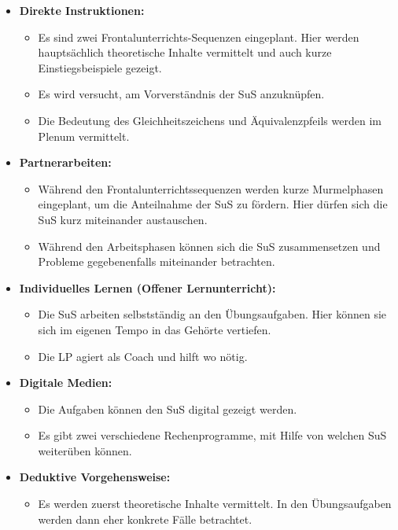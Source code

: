 \documentclass[
  10pt,
  a4paper,
  DIV=11]{scrartcl}
\providecommand{\tightlist}{%
  \setlength{\itemsep}{0pt}\setlength{\parskip}{0pt}}\usepackage{longtable,booktabs,array}
\begin{document}
\begin{itemize}
\tightlist
\item
  \textbf{Direkte Instruktionen:}

  \begin{itemize}
  \tightlist
  \item
    Es sind zwei Frontalunterrichts-Sequenzen eingeplant. Hier werden
    hauptsächlich theoretische Inhalte vermittelt und auch kurze
    Einstiegsbeispiele gezeigt.
  \item
    Es wird versucht, am Vorverständnis der SuS anzuknüpfen.
  \item
    Die Bedeutung des Gleichheitszeichens und Äquivalenzpfeils werden im
    Plenum vermittelt.
  \end{itemize}
\item
  \textbf{Partnerarbeiten:}

  \begin{itemize}
  \tightlist
  \item
    Während den Frontalunterrichtssequenzen werden kurze Murmelphasen
    eingeplant, um die Anteilnahme der SuS zu fördern. Hier dürfen sich
    die SuS kurz miteinander austauschen.
  \item
    Während den Arbeitsphasen können sich die SuS zusammensetzen und
    Probleme gegebenenfalls miteinander betrachten.
  \end{itemize}
\item
  \textbf{Individuelles Lernen (Offener Lernunterricht):}

  \begin{itemize}
  \tightlist
  \item
    Die SuS arbeiten selbstständig an den Übungsaufgaben. Hier können
    sie sich im eigenen Tempo in das Gehörte vertiefen.
  \item
    Die LP agiert als Coach und hilft wo nötig.
  \end{itemize}
\item
  \textbf{Digitale Medien:}

  \begin{itemize}
  \tightlist
  \item
    Die Aufgaben können den SuS digital gezeigt werden.
  \item
    Es gibt zwei verschiedene Rechenprogramme, mit Hilfe von welchen SuS
    weiterüben können.
  \end{itemize}
\item
  \textbf{Deduktive Vorgehensweise:}

  \begin{itemize}
  \tightlist
  \item
    Es werden zuerst theoretische Inhalte vermittelt. In den
    Übungsaufgaben werden dann eher konkrete Fälle betrachtet.
  \end{itemize}
\end{itemize}
\end{document}
